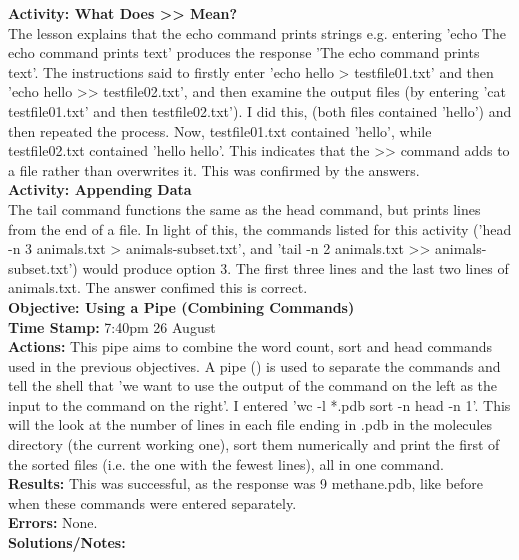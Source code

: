 \documentclass{article}
\begin{document}
\begin{FlushLeft}
\textbf{Activity: What Does \textgreater\textgreater{}  Mean?}\\
The lesson explains that the echo command prints strings e.g. entering 'echo The echo command prints text' produces the response 'The echo command prints text'. The instructions said to firstly enter 'echo hello \textgreater{}  testfile01.txt' and then 'echo hello \textgreater \textgreater{}  testfile02.txt', and then examine the output files (by entering 'cat testfile01.txt' and then testfile02.txt'). I did this, (both files contained 'hello') and then repeated the process. Now, testfile01.txt contained 'hello', while testfile02.txt contained 'hello hello'. This indicates that the \textgreater \textgreater{}  command adds to a file rather than overwrites it. This was confirmed by the answers.\\
\vspace{5mm}
\textbf{Activity: Appending Data}\\
The tail command functions the same as the head command, but prints lines from the end of a file. In light of this, the commands listed for this activity ('head -n 3 animals.txt \textgreater{}  animals-subset.txt', and 'tail -n 2 animals.txt \textgreater \textgreater{}  animals-subset.txt') would produce option 3. The first three lines and the last two lines of animals.txt. The answer confimed this is correct.\\
\vspace{5mm}
\textbf{Objective: Using a Pipe (Combining Commands)}\\ 
\textbf{Time Stamp:} 7:40pm 26 August\\
\textbf{Actions:} This pipe aims to combine the word count, sort and head commands used in the previous objectives. A pipe (\textbar{}) is used to separate the commands and tell the shell that 'we want to use the output of the command on the left as the input to the command on the right'. I entered 'wc -l *.pdb \textbar{}{} sort -n \textbar{} head -n 1'. This will the look at the number of lines in each file ending in .pdb in the molecules directory (the current working one), sort them numerically and print the first of the sorted files (i.e. the one with the fewest lines), all in one command.\\
\textbf{Results:} This was successful, as the response was 9 methane.pdb, like before when these commands were entered separately. \\
\textbf{Errors:} None.\\
\textbf{Solutions/Notes:}\\

\end{FlushLeft}
\end{document}
